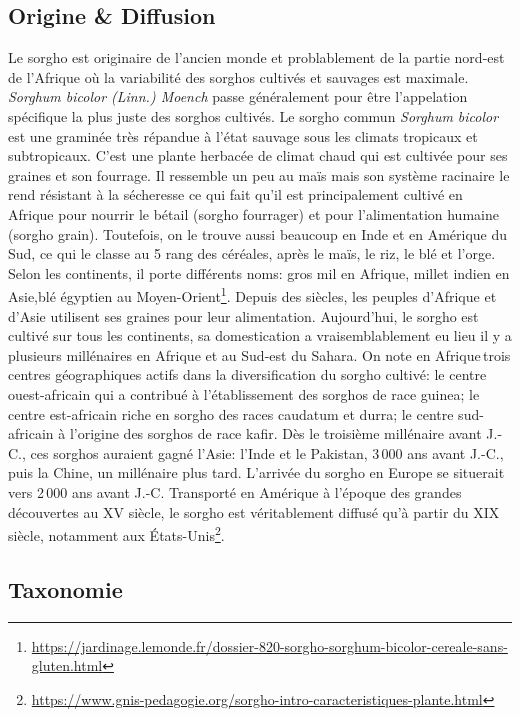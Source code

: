 \documentclass[a4paper,11pt]{article}
\begin{document}
  
\subsection{Origine \& Diffusion}

Le sorgho est originaire de l'ancien monde et problablement de la
partie nord-est de l'Afrique où la variabilité des sorghos cultivés et
sauvages est maximale. \emph{ Sorghum bicolor (Linn.) Moench} passe
généralement pour être l'appelation spécifique la plus juste des
sorghos cultivés\cite{food1977introduction}. Le sorgho commun
\emph{Sorghum bicolor} est une graminée très répandue à l’état sauvage
sous les climats tropicaux et subtropicaux. C’est une plante herbacée
de climat chaud qui est cultivée pour ses graines et son fourrage. Il
ressemble un peu au maïs mais son système racinaire le rend résistant
à la sécheresse ce qui fait qu'il est principalement cultivé en
Afrique pour nourrir le bétail (sorgho fourrager) et pour
l'alimentation humaine (sorgho grain). Toutefois, on le trouve aussi
beaucoup en Inde et en Amérique du Sud, ce qui le classe au 5\ieme{} rang
des céréales, après le maïs, le riz, le blé et l'orge. Selon les
continents, il porte différents noms: \og{}gros mil\fg{} en Afrique,
\og{}millet indien\fg{} en Asie,\og{}blé égyptien\fg{} au
Moyen-Orient\footnote{\url{https://jardinage.lemonde.fr/dossier-820-sorgho-sorghum-bicolor-cereale-sans-gluten.html}}. Depuis
des siècles, les peuples d’Afrique et d’Asie utilisent ses graines
pour leur alimentation. Aujourd’hui, le sorgho est cultivé sur tous
les continents, sa domestication a vraisemblablement eu lieu il y a
plusieurs millénaires en Afrique et au Sud-est du Sahara. On note en
Afrique\,trois centres géographiques actifs dans la diversification du
sorgho cultivé: le centre ouest-africain qui a contribué à
l’établissement des sorghos de race guinea; le centre est-africain
riche en sorgho des races caudatum et durra; le centre sud-africain à
l’origine des sorghos de race kafir. Dès le troisième millénaire avant
J.-C., ces sorghos auraient gagné l’Asie: l’Inde et le Pakistan,
3\,000 ans avant J.-C., puis la Chine, un millénaire plus
tard. L’arrivée du sorgho en Europe se situerait vers 2\,000 ans avant
J.-C. Transporté en Amérique à l’époque des grandes découvertes au
XV\ieme{} siècle, le sorgho est véritablement diffusé qu’à partir du
XIX\ieme{} siècle, notamment aux
États-Unis\footnote{\url{https://www.gnis-pedagogie.org/sorgho-intro-caracteristiques-plante.html}}.

\subsection{Taxonomie}
\end{document}

